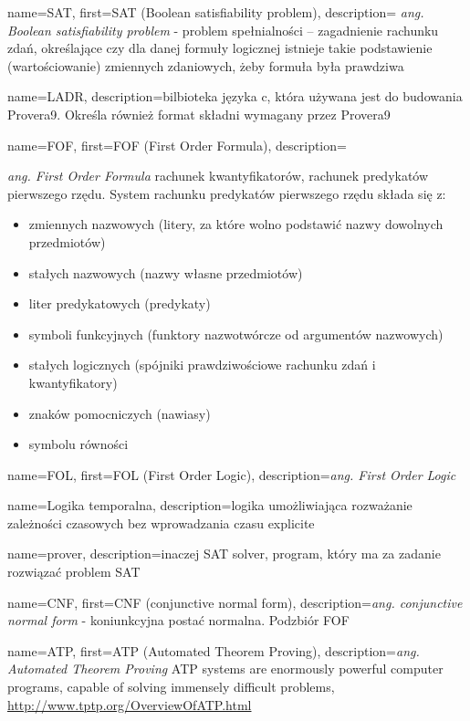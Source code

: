 
 {
    name=SAT,
    first={SAT (Boolean satisfiability problem)},
    description={ \textit{ang. Boolean satisfiability problem} - problem spełnialności – zagadnienie rachunku zdań, określające czy dla danej formuły logicznej istnieje takie podstawienie (wartościowanie) zmiennych zdaniowych, żeby formuła była prawdziwa}
}

 {
    name=LADR,
    description={bilbioteka języka c, która używana jest do budowania Provera9. Określa również format składni wymagany przez Provera9}
}

 {
    name=FOF,
    first={FOF (First Order Formula)},
    description={\textit{ang. First Order Formula} rachunek kwantyfikatorów, rachunek predykatów pierwszego rzędu. System rachunku predykatów pierwszego rzędu składa się z:
\begin{itemize}
    \item zmiennych nazwowych (litery, za które wolno podstawić nazwy dowolnych przedmiotów)
    \item stałych nazwowych (nazwy własne przedmiotów)
    \item liter predykatowych (predykaty)
    \item symboli funkcyjnych (funktory nazwotwórcze od argumentów nazwowych)
    \item stałych logicznych (spójniki prawdziwościowe rachunku zdań i kwantyfikatory)
    \item znaków pomocniczych (nawiasy)
    \item symbolu równości
\end{itemize}
    }
}
 {
    name=FOL,
    first={FOL (First Order Logic)},
    description={\textit{ang. First Order Logic}}
}

 {
    name={Logika temporalna},
    description={logika umożliwiająca rozważanie zależności czasowych bez wprowadzania czasu explicite}
}

 {
    name=prover,
    description={inaczej SAT solver, program, który ma za zadanie rozwiązać problem SAT}
}

 {
    name=CNF,
    first={CNF (conjunctive normal form)},
    description={\textit{ang. conjunctive normal form} - koniunkcyjna postać normalna. Podzbiór FOF}
}

 {
    name=ATP,
    first={ATP (Automated Theorem Proving)},
    description={\textit{ang. Automated Theorem Proving} ATP systems are enormously powerful computer programs, capable of solving immensely difficult problems, \url{http://www.tptp.org/OverviewOfATP.html}}
}


